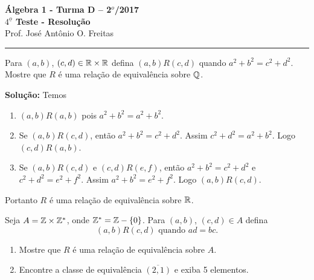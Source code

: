 \documentclass[12pt]{article}
\begin{document}


\begin{center}
{\Large\bf {\'A}lgebra 1 - Turma D -- 2$^{o}$/2017} \\ \vspace{9pt} {\large\bf
  $4^{\underline{o}}$ Teste - Resolu\c{c}\~ao}\\
\vspace{9pt} Prof. Jos{\'e} Ant{\^o}nio O. Freitas
\end{center}
\hrule

\vspace{.6cm}

\questao Para $(a,b)$, $(c,d) \in \mathbb{R} \times \mathbb{R}$ defina $(a,b)R(c,d)$ quando $a^2 + b^2 = c^2 + d^2$. Mostre que $R$ é uma relação de equivalência sobre $\mathbb{Q}$.

\noindent\textbf{Solu\c{c}\~ao:} Temos
\begin{enumerate}[label={\roman*})]
	\item $(a,b)R(a,b)$ pois $a^2 + b^2 = a^2 + b^2$.
	\item Se $(a,b)R(c,d)$, então $a^2 + b^2 = c^2 + d^2$. Assim $c^2 + d^2 = a^2 +  b^2$. Logo $(c,d)R(a,b)$.
	\item Se $(a,b)R(c,d)$ e $(c,d)R(e,f)$, então $a^2 + b^2 = c^2 + d^2$ e $c^2 + d^2 = e^2 + f^2$. Assim $a^2 + b^2 = e^2 + f^2$. Logo $(a,b)R(c,d)$.
\end{enumerate}

Portanto $R$ é uma relação de equivalência sobre $\mathbb{R}$.


\vspace{.5cm}

\questao Seja $A = \mathbb{Z} \times \mathbb{Z}^*$, onde $\mathbb{Z}^* = \mathbb{Z} - \{0\}$. Para $(a,b)$, $(c,d) \in A$ defina
\[
	(a,b)R(c,d) \mbox{ quando } ad=bc.
\]

\begin{enumerate}[label={\alph*})]
	\item Mostre que $R$ é uma rela{\c c}{\~a}o de equival{\^e}ncia sobre $A$.
	\item Encontre a classe de equivalência $\overline{(2,1)}$ e exiba 5 elementos.
\end{enumerate}
\end{document}
